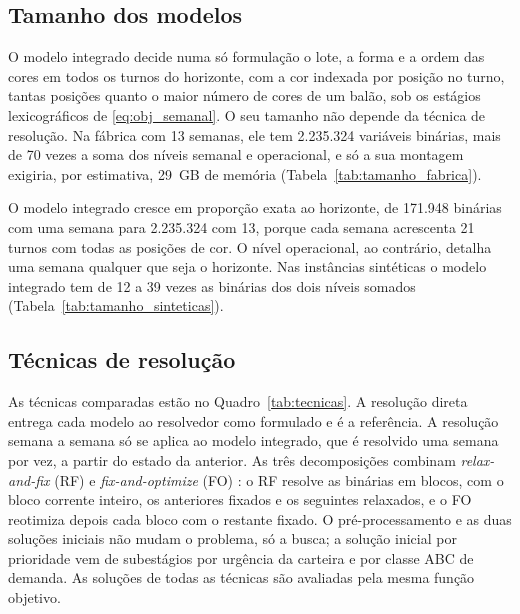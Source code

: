 \documentclass[
    12pt,
    openright,
    oneside,
    a4paper,
    fleqn,
    chapter=TITLE,
    section=TITLE,
    english,
    brazil
]{abntex2}
\begin{document}
\subsection{Tamanho dos modelos}

O modelo integrado decide numa só formulação o lote, a forma e a ordem das cores em todos os turnos do horizonte, com a cor indexada por posição no turno, tantas posições quanto o maior número de cores de um balão, sob os estágios lexicográficos de \eqref{eq:obj_semanal}. O seu tamanho não depende da técnica de resolução. Na fábrica com 13 semanas, ele tem 2.235.324 variáveis binárias, mais de 70 vezes a soma dos níveis semanal e operacional, e só a sua montagem exigiria, por estimativa, 29~GB de memória (Tabela~\ref{tab:tamanho_fabrica}).

\begin{table}[htbp]
\centering
\small
\caption{Tamanho dos modelos na instância da fábrica, com 13 semanas.}
\label{tab:tamanho_fabrica}

\end{table}

O modelo integrado cresce em proporção exata ao horizonte, de 171.948 binárias com uma semana para 2.235.324 com 13, porque cada semana acrescenta 21 turnos com todas as posições de cor. O nível operacional, ao contrário, detalha uma semana qualquer que seja o horizonte. Nas instâncias sintéticas o modelo integrado tem de 12 a 39 vezes as binárias dos dois níveis somados (Tabela~\ref{tab:tamanho_sinteticas}).

\begin{table}[htbp]
\centering
\small
\caption{Variáveis binárias dos modelos nas instâncias sintéticas.}
\label{tab:tamanho_sinteticas}

\end{table}

\subsection{Técnicas de resolução}

As técnicas comparadas estão no Quadro~\ref{tab:tecnicas}. A resolução direta entrega cada modelo ao resolvedor como formulado e é a referência. A resolução semana a semana só se aplica ao modelo integrado, que é resolvido uma semana por vez, a partir do estado da anterior. As três decomposições combinam \textit{relax-and-fix} (RF) \cite{pochetwolsey2006} e \textit{fix-and-optimize} (FO) \cite{helbersahling2010}: o RF resolve as binárias em blocos, com o bloco corrente inteiro, os anteriores fixados e os seguintes relaxados, e o FO reotimiza depois cada bloco com o restante fixado. O pré-processamento e as duas soluções iniciais não mudam o problema, só a busca; a solução inicial por prioridade vem de subestágios por urgência da carteira e por classe ABC de demanda. As soluções de todas as técnicas são avaliadas pela mesma função objetivo.
\end{document}
